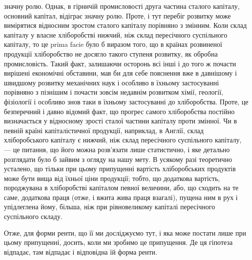 \parcont{}  %
значну ролю. Однак, в гірничій промисловості друга частина сталого капіталу, основний капітал,
відіграє значну ролю. Проте, і тут перебіг розвитку може вимірятися відносним зростом сталого
капіталу порівняно з змінним.
Коли склад капіталу у власне хліборобстві нижчий, ніж склад пересічного
суспільного капіталу, то це prima facie було б виразом того, що в країнах
розвиненої продукції хліборобство не досягло такого ступеня розвитку, як обробна промисловість.
Такий факт, залишаючи осторонь всі інші і до того ж почасти вирішені економічні обставини, мав би
для себе пояснення вже в давнішому і швидшому розвитку механічних наук і особливо в їхньому
застосуванні порівняно з пізнішим і почасти зовсім недавнім розвитком хімії, геології, фізіології і
особливо знов таки в їхньому застосуванні до хліборобства. Проте, це безперечний і давно відомий
факт, що прогрес самого хліборобства постійно визначається у відносному зрості сталої частини
капіталу проти змінної. Чи в певній країні капіталістичної продукції, наприклад, в Англії, склад
хліборобського капіталу є нижчий, ніж склад пересічного суспільного капіталу, — це питання, що його
можна розв’язати лише статистично, і яке детально розглядати було б зайвим з огляду на нашу мету. В
усякому разі теоретично усталено, що тільки при цьому припущенні вартість хліборобських продуктів
може бути вища від їхньої ціни продукції; тобто, що додаткова вартість, породжувана в хліборобстві
капіталом певної величини, або, що сходить на те саме, додаткова праця (отже, і вжита жива праця
взагалі), пущена ним в рух і упідлеглена йому, більша, ніж при рівновеликому капіталі пересічного
суспільного складу.

      Отже, для форми ренти, що її ми досліджуємо тут, і яка може постати лише
при цьому припущенні, досить, коли ми зробимо це припущення. Де ця гіпотеза
відпадає, там відпадає і відповідна їй форма ренти.

